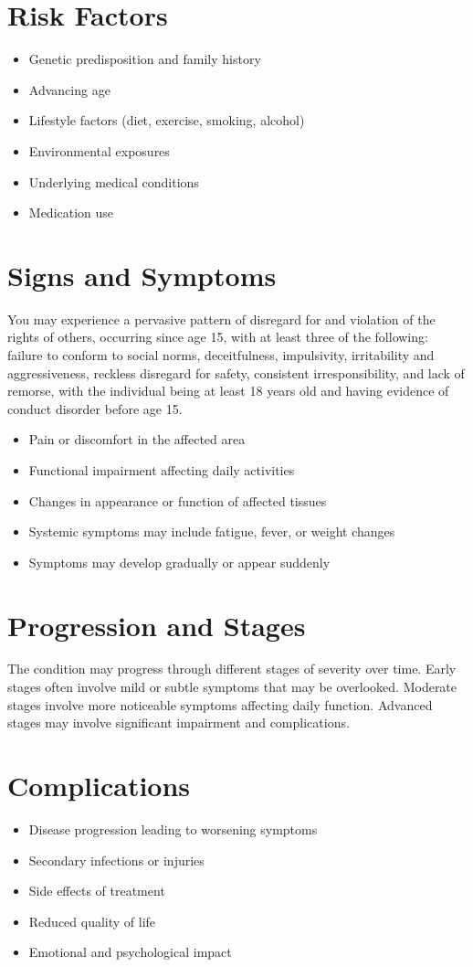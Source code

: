 \section{Risk Factors}
\begin{itemize}[noitemsep]
  \item Genetic predisposition and family history
  \item Advancing age
  \item Lifestyle factors (diet, exercise, smoking, alcohol)
  \item Environmental exposures
  \item Underlying medical conditions
  \item Medication use
\end{itemize}
\section{Signs and Symptoms}
You may experience a pervasive pattern of disregard for and violation of the rights of others, occurring since age 15, with at least three of the following: failure to conform to social norms, deceitfulness, impulsivity, irritability and aggressiveness, reckless disregard for safety, consistent irresponsibility, and lack of remorse, with the individual being at least 18 years old and having evidence of conduct disorder before age 15.

\begin{itemize}[noitemsep]
  \item Pain or discomfort in the affected area
  \item Functional impairment affecting daily activities
  \item Changes in appearance or function of affected tissues
  \item Systemic symptoms may include fatigue, fever, or weight changes
  \item Symptoms may develop gradually or appear suddenly
\end{itemize}
\section{Progression and Stages}
The condition may progress through different stages of severity over time. Early stages often involve mild or subtle symptoms that may be overlooked. Moderate stages involve more noticeable symptoms affecting daily function. Advanced stages may involve significant impairment and complications.
\section{Complications}
\begin{itemize}[noitemsep]
  \item Disease progression leading to worsening symptoms
  \item Secondary infections or injuries
  \item Side effects of treatment
  \item Reduced quality of life
  \item Emotional and psychological impact
\end{itemize}
